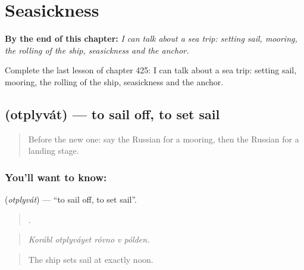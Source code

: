
\chapter{Seasickness}
\label{ch:ru-seasickness}

\begin{chapteropening}
\textbf{By the end of this chapter:} \emph{I can talk about a sea trip: setting sail, mooring, the rolling of the ship, seasickness and the anchor.}

Complete the last lesson of chapter 425: I can talk about a sea trip: setting sail, mooring, the rolling of the ship, seasickness and the anchor.
\end{chapteropening}

\section[\texorpdfstring{\ru{отплывать} (otplyvát)}{отплывать (otplyvát)}]{ (otplyvát) — to sail off, to set sail}

\label{lesson:RU-C425-otplyvat}



\begin{quote}
Before the new one: say the Russian for a mooring, then the Russian for a landing stage.
\end{quote}

\subsection*{You'll want to know: }
\textbf{} (\emph{otplyvát}) — \textquotedblleft{}to sail off, to set sail\textquotedblright{}.

\begin{quote}
    .
\end{quote}

\begin{quote}
\emph{Korábl otplyváyet róvno v pólden.}
\end{quote}

\begin{quote}
The ship sets sail at exactly noon.
\end{quote}

